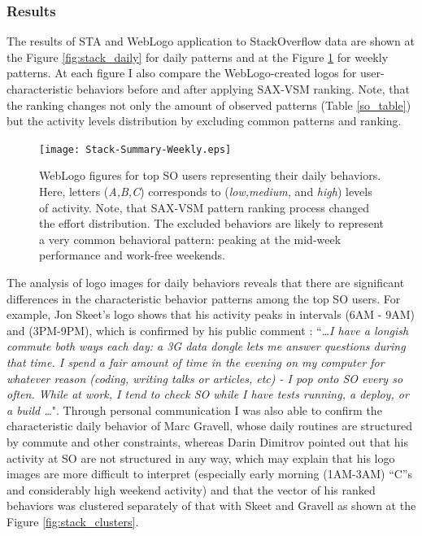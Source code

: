 \subsubsection{Results}
The results of STA and WebLogo application to StackOverflow data are shown at the Figure \ref{fig:stack_daily} for daily patterns and at the Figure \ref{fig:stack_weekly} for weekly patterns. At each figure I also compare the WebLogo-created logos for user-characteristic behaviors before and after applying SAX-VSM ranking. Note, that the ranking changes not only the amount of observed patterns (Table \ref{so_table}) but the activity levels distribution by excluding common patterns and ranking.

\begin{figure}[t]
   \centering
   \texttt{[image: Stack-Summary-Weekly.eps]}
   \caption{WebLogo figures for top SO users representing their daily behaviors. Here, letters (\textit{A,B,C}) corresponds to (\textit{low,medium,} and \textit{high}) levels of activity. Note, that SAX-VSM pattern ranking process changed the effort distribution. 
   The excluded behaviors are likely to represent a very common behavioral pattern: peaking at the mid-week performance and work-free weekends.}
   \label{fig:stack_weekly}   
\end{figure}

The analysis of logo images for daily behaviors reveals that there are significant differences in the characteristic behavior patterns among the top SO users. For example, Jon Skeet's logo shows that his activity peaks in intervals (6AM - 9AM) and (3PM-9PM), which is confirmed by his public comment \cite{skeet}: ``\textit{\dots I have a longish commute both ways each day: a 3G data dongle lets me answer questions during that time. I spend a fair amount of time in the evening on my computer for whatever reason (coding, writing talks or articles, etc) - I pop onto SO every so often. While at work, I tend to check SO while I have tests running, a deploy, or a build \dots}". Through personal communication I was also able to confirm the characteristic daily behavior of Marc Gravell, whose daily routines are structured by commute and other constraints, whereas Darin Dimitrov pointed out that his activity at SO are not structured in any way, which may explain that his logo images are more difficult to interpret (especially early morning (1AM-3AM) ``C''s and considerably high weekend activity) and that the vector of his ranked behaviors was clustered separately of that with Skeet and Gravell as shown at the Figure \ref{fig:stack_clusters}.


